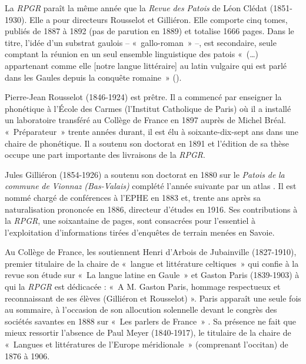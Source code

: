 \documentclass[output=paper]{langsci/langscibook}
\begin{document}
La \textit{RPGR} paraît la même année que la \textit{Revue} \textit{des} \textit{Patois} de Léon Clédat (1851-1930). Elle a pour directeurs Rousselot et Gilliéron. Elle comporte cinq tomes, publiés de 1887 à 1892 (pas de parution en 1889) et totalise 1666 pages. Dans le titre, l’idée d’un substrat gaulois – «~gallo-roman~» –, est secondaire, seule comptant la réunion en un seul ensemble linguistique des patois «~(…) appartenant comme elle [notre langue littéraire] au latin vulgaire qui est parlé dans les Gaules depuis la conquête romaine~» (\citealt[1]{rousselot_introduction_1887}). 

Pierre-Jean Rousselot (1846-1924) est prêtre. Il a commencé par enseigner la phonétique à l’École des Carmes (l’Institut Catholique de Paris) où il a installé un laboratoire transféré au Collège de France en 1897 auprès de Michel Bréal. «~Préparateur~» trente années durant, il est élu à soixante-dix-sept ans dans une chaire de phonétique. Il a soutenu son doctorat en 1891 et l’édition de sa thèse occupe une part importante des livraisons de la \textit{RPGR}. 

Jules Gilliéron (1854-1926) a soutenu son doctorat en 1880 sur le \textit{Patois} \textit{de} \textit{la} \textit{commune} \textit{de} \textit{Vionnaz} \textit{(Bas-Valais)} complété l’année suivante par un atlas \citep{gillieron_petit_1881}. Il est nommé chargé de conférences à l’EPHE en 1883 et, trente ans après sa naturalisation prononcée en 1886, directeur d’études en 1916. Ses contributions à la \textit{RPGR}, une soixantaine de pages, sont consacrées pour l’essentiel à l’exploitation d’informations tirées d’enquêtes de terrain menées en Savoie. \medskip

Au Collège de France, les soutiennent Henri d’Arbois de Jubainville (1827-1910), premier titulaire de la chaire de «~langue et littérature celtiques~» qui confie à la revue son étude sur «~La langue latine en Gaule~» \citeyear[161-171]{arbois_de_jubainville_langue_1887} et Gaston Paris (1839-1903) à qui la \textit{RPGR} est dédicacée : «~A M. Gaston Paris, hommage respectueux et reconnaissant de ses élèves (Gilliéron et Rousselot) ». Paris apparaît une seule fois au sommaire, à l’occasion de son allocution solennelle devant le congrès des sociétés savantes en 1888 sur «~Les parlers de France~» \citeyear[161-175]{paris_les_1888}. Sa présence ne fait que mieux ressortir l’absence de Paul Meyer (1840-1917), le titulaire de la chaire de «~Langues et littératures de l’Europe méridionale~» (comprenant l’occitan) de 1876 à 1906.
\end{document}
